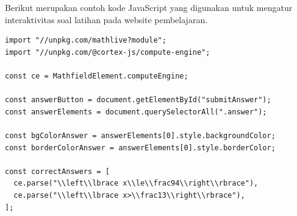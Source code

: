 \documentclass{file/KP-ITS}
\theoremstyle{definition}
\theoremstyle{definition}
\theoremstyle{plain}
\begin{document}
\cleardoublepage
{}
Berikut merupakan contoh kode JavaScript yang digunakan untuk mengatur interaktivitas soal latihan pada website pembelajaran.
\begin{verbatim}
import "//unpkg.com/mathlive?module";
import "//unpkg.com/@cortex-js/compute-engine";

const ce = MathfieldElement.computeEngine;

const answerButton = document.getElementById("submitAnswer");
const answerElements = document.querySelectorAll(".answer");

const bgColorAnswer = answerElements[0].style.backgroundColor;
const borderColorAnswer = answerElements[0].style.borderColor;

const correctAnswers = [
  ce.parse("\\left\\lbrace x\\le\\frac94\\right\\rbrace"),
  ce.parse("\\left\\lbrace x>\\frac13\\right\\rbrace"),
];


\end{verbatim}
\end{document}
